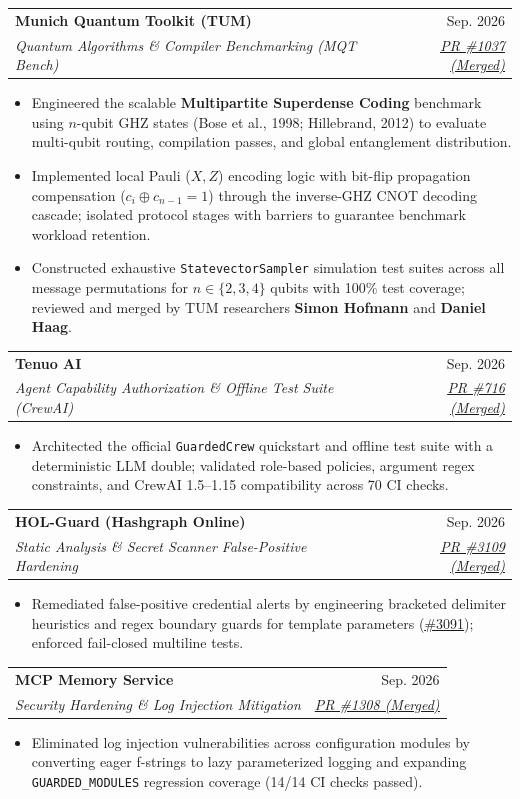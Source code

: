\documentclass[letterpaper,10pt]{article}
\makeatletter
\newcommand{\resumeItem}[1]{
  \item\small{
    {#1 \vspace{-1.5pt}}
  }
}
\newcommand{\resumeSubheading}[4]{
  \vspace{-3pt}\item
    \begin{tabular*}{0.98\textwidth}[t]{l@{\extracolsep{\fill}}r}
      \textbf{#1} & #2 \\
      \textit{\small#3} & \textit{\small #4} \\
    \end{tabular*}\vspace{-6pt}
}
\newcommand{\resumeItemListStart}{\begin{itemize}[leftmargin=0.15in, itemsep=0.5pt, parsep=0pt, topsep=0pt]}
\newcommand{\resumeItemListEnd}{\end{itemize}\vspace{-3pt}}
\makeatother
\begin{document}
    \resumeSubheading
      {Munich Quantum Toolkit (TUM)}{Sep. 2026}
      {Quantum Algorithms \& Compiler Benchmarking (MQT Bench)}{\href{https://github.com/munich-quantum-toolkit/bench/pull/1037}{\underline{PR \#1037 (Merged)}}}
      \resumeItemListStart
        \resumeItem{Engineered the scalable \textbf{Multipartite Superdense Coding} benchmark using $n$-qubit GHZ states (Bose et al., 1998; Hillebrand, 2012) to evaluate multi-qubit routing, compilation passes, and global entanglement distribution.}
        \resumeItem{Implemented local Pauli ($X, Z$) encoding logic with bit-flip propagation compensation ($c_i \oplus c_{n-1} = 1$) through the inverse-GHZ CNOT decoding cascade; isolated protocol stages with barriers to guarantee benchmark workload retention.}
        \resumeItem{Constructed exhaustive \texttt{StatevectorSampler} simulation test suites across all message permutations for $n \in \{2, 3, 4\}$ qubits with 100\% test coverage; reviewed and merged by TUM researchers \textbf{Simon Hofmann} and \textbf{Daniel Haag}.}
      \resumeItemListEnd

    \resumeSubheading
      {Tenuo AI}{Sep. 2026}
      {Agent Capability Authorization \& Offline Test Suite (CrewAI)}{\href{https://github.com/tenuo-ai/tenuo/pull/716}{\underline{PR \#716 (Merged)}}}
      \resumeItemListStart
        \resumeItem{Architected the official \texttt{GuardedCrew} quickstart and offline test suite with a deterministic LLM double; validated role-based policies, argument regex constraints, and CrewAI 1.5--1.15 compatibility across 70 CI checks.}
      \resumeItemListEnd

    \resumeSubheading
      {HOL-Guard (Hashgraph Online)}{Sep. 2026}
      {Static Analysis \& Secret Scanner False-Positive Hardening}{\href{https://github.com/hashgraph-online/hol-guard/pull/3109}{\underline{PR \#3109 (Merged)}}}
      \resumeItemListStart
        \resumeItem{Remediated false-positive credential alerts by engineering bracketed delimiter heuristics and regex boundary guards for template parameters (\href{https://github.com/hashgraph-online/hol-guard/issues/3091}{\underline{\#3091}}); enforced fail-closed multiline tests.}
      \resumeItemListEnd

    \resumeSubheading
      {MCP Memory Service}{Sep. 2026}
      {Security Hardening \& Log Injection Mitigation}{\href{https://github.com/doobidoo/mcp-memory-service/pull/1308}{\underline{PR \#1308 (Merged)}}}
      \resumeItemListStart
        \resumeItem{Eliminated log injection vulnerabilities across configuration modules by converting eager f-strings to lazy parameterized logging and expanding \texttt{GUARDED\_MODULES} regression coverage (14/14 CI checks passed).}
      \resumeItemListEnd
\end{document}
